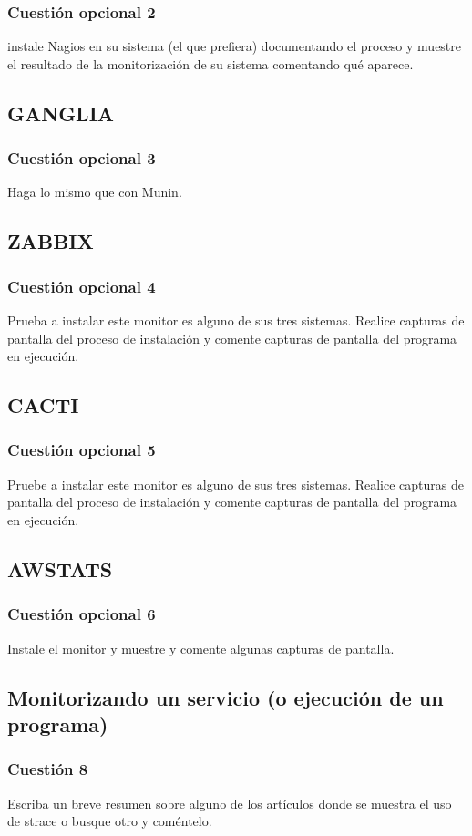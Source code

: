 \subsubsection{Cuestión opcional 2}
instale Nagios en su sistema (el que prefiera)
documentando el proceso y muestre el resultado de la monitorización de su
sistema comentando qué aparece.
\subsection{GANGLIA}
\subsubsection{Cuestión opcional 3}
Haga lo mismo que con Munin.
\subsection{ZABBIX}
\subsubsection{Cuestión opcional 4}
Prueba a instalar este monitor es alguno de sus tres
sistemas. Realice capturas de pantalla del proceso de instalación y comente
capturas de pantalla del programa en ejecución.
\subsection{CACTI}
\subsubsection{Cuestión opcional 5}
Pruebe a instalar este monitor es alguno de sus tres
sistemas. Realice capturas de pantalla del proceso de instalación y comente
capturas de pantalla del programa en ejecución.
\subsection{AWSTATS}
\subsubsection{Cuestión opcional 6}
Instale el monitor y muestre y comente algunas
capturas de pantalla.
\subsection{Monitorizando un servicio (o ejecución de un programa)}
\subsubsection{Cuestión 8}
Escriba un breve resumen sobre alguno de los artículos donde
se muestra el uso de strace o busque otro y coméntelo.
